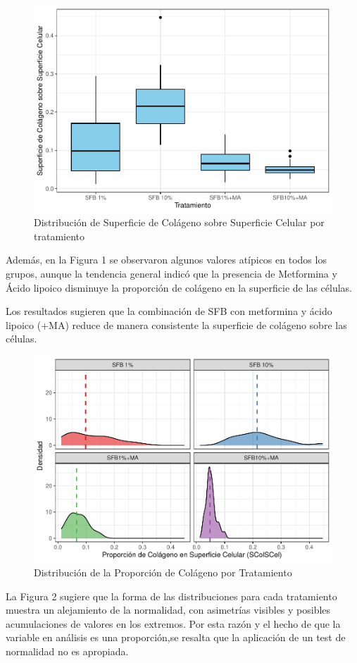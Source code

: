 \documentclass[
  11pt,
]{article}
\begin{document}
\begin{figure}

{\centering \includegraphics[width=0.55\linewidth,height=0.35\textheight]{Trabajo-Practico-NP_files/figure-latex/unnamed-chunk-4-1} 

}

\caption{Distribución de Superficie de Colágeno sobre Superficie Celular por tratamiento}\label{fig:unnamed-chunk-4}
\end{figure}

Además, en la Figura 1 se observaron algunos valores atípicos en todos
los grupos, aunque la tendencia general indicó que la presencia de
Metformina y Ácido lipoico disminuye la proporción de colágeno en la
superficie de las células.

Los resultados sugieren que la combinación de SFB con metformina y ácido
lipoico (+MA) reduce de manera consistente la superficie de colágeno
sobre las células.

\begin{figure}

{\centering \includegraphics[width=0.55\linewidth,height=0.35\textheight]{Trabajo-Practico-NP_files/figure-latex/unnamed-chunk-5-1} 

}

\caption{Distribución de la Proporción de Colágeno por Tratamiento}\label{fig:unnamed-chunk-5}
\end{figure}
\newpage

La Figura 2 sugiere que la forma de las distribuciones para cada
tratamiento muestra un alejamiento de la normalidad, con asimetrías
visibles y posibles acumulaciones de valores en los extremos. Por esta
razón y el hecho de que la variable en análisis es una proporción,se
resalta que la aplicación de un test de normalidad no es apropiada.
\end{document}

